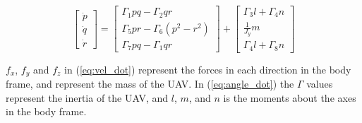 \begin{equation}
\label{eq:angle_dot}
	\begin{bmatrix}
		\dot{p} \\ \dot{q} \\ \dot{r}
	\end{bmatrix}
	=
	\begin{bmatrix}
		\Gamma_1pq - \Gamma_2qr \\
		\Gamma_5pr - \Gamma_6(p^2-r^2)\\
		\Gamma_7pq - \Gamma_1qr
	\end{bmatrix}
	+
	\begin{bmatrix}
		\Gamma_3l + \Gamma_4n \\
		\frac{1}{J_y}m\\
		\Gamma_4l + \Gamma_8n
	\end{bmatrix}
\end{equation}

$f_x$, $f_y$ and $f_z$ in (\ref{eq:vel_dot}) represent the forces in each direction in the body frame, and  represent the mass of the UAV. In (\ref{eq:angle_dot}) the $\Gamma$ values represent the inertia of the UAV, and $l$, $m$, and $n$ is the moments about the axes in the body frame.
